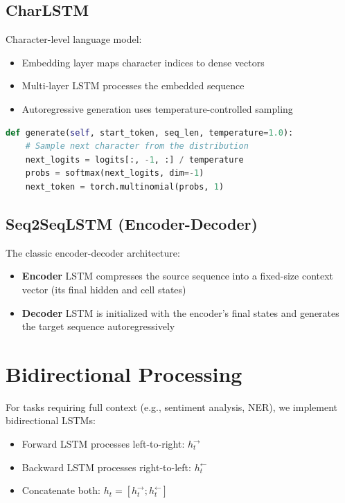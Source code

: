\documentclass[12pt]{article}
\begin{document}
\subsection*{CharLSTM}
Character-level language model:
\begin{itemize}
    \item Embedding layer maps character indices to dense vectors
    \item Multi-layer LSTM processes the embedded sequence
    \item Autoregressive generation uses temperature-controlled sampling
\end{itemize}

\begin{lstlisting}[language=Python, basicstyle=\small\ttfamily, commentstyle=\color{green!60!black}]
def generate(self, start_token, seq_len, temperature=1.0):
    # Sample next character from the distribution
    next_logits = logits[:, -1, :] / temperature
    probs = softmax(next_logits, dim=-1)
    next_token = torch.multinomial(probs, 1)
\end{lstlisting}

\subsection*{Seq2SeqLSTM (Encoder-Decoder)}
The classic encoder-decoder architecture:
\begin{itemize}
    \item \textbf{Encoder} LSTM compresses the source sequence into a fixed-size context vector (its final hidden and cell states)
    \item \textbf{Decoder} LSTM is initialized with the encoder's final states and generates the target sequence autoregressively
\end{itemize}

\section*{Bidirectional Processing}
For tasks requiring full context (e.g., sentiment analysis, NER), we implement bidirectional LSTMs:
\begin{itemize}
    \item Forward LSTM processes left-to-right: $h_t^{\rightarrow}$
    \item Backward LSTM processes right-to-left: $h_t^{\leftarrow}$
    \item Concatenate both: $h_t = [h_t^{\rightarrow}; h_t^{\leftarrow}]$
\end{itemize}
\end{document}
